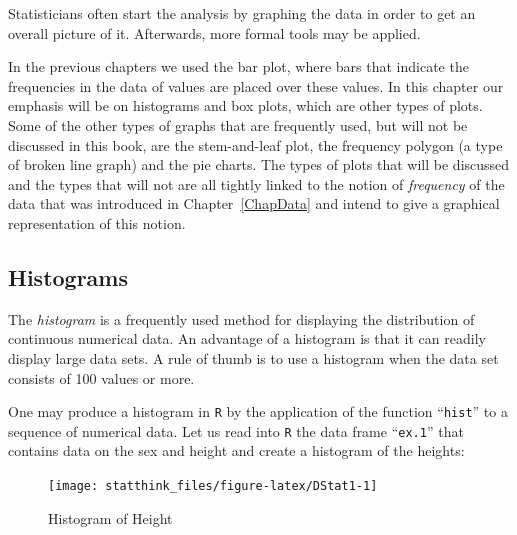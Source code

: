 \documentclass[]{krantz}
\makeatletter
\newenvironment{Shaded}{\begin{snugshade}}{\end{snugshade}}
\newcommand{\FloatTok}[1]{\textcolor[rgb]{0.00,0.00,0.81}{#1}}
\newcommand{\KeywordTok}[1]{\textcolor[rgb]{0.13,0.29,0.53}{\textbf{#1}}}
\newcommand{\NormalTok}[1]{#1}
\newcommand{\OperatorTok}[1]{\textcolor[rgb]{0.81,0.36,0.00}{\textbf{#1}}}
\newcommand{\StringTok}[1]{\textcolor[rgb]{0.31,0.60,0.02}{#1}}
\newenvironment{kframe}{%
\medskip{}
\setlength{\fboxsep}{.8em}
 \def\at@end@of@kframe{}%
 \ifinner\ifhmode%
  \def\at@end@of@kframe{\end{minipage}}%
  \begin{minipage}{\columnwidth}%
 \fi\fi%
 \def\FrameCommand##1{\hskip\@totalleftmargin \hskip-\fboxsep
 \colorbox{shadecolor}{##1}\hskip-\fboxsep
     \hskip-\linewidth \hskip-\@totalleftmargin \hskip\columnwidth}%
 \MakeFramed {\advance\hsize-\width
   \@totalleftmargin\z@ \linewidth\hsize
   \@setminipage}}%
 {\par\unskip\endMakeFramed%
 \at@end@of@kframe}
\renewenvironment{Shaded}{\begin{kframe}}{\end{kframe}}
\theoremstyle{definition}
\theoremstyle{definition}
\theoremstyle{definition}
\theoremstyle{remark}
\makeatother
\begin{document}
Statisticians often start the analysis by graphing the data in order to
get an overall picture of it. Afterwards, more formal tools may be
applied.

In the previous chapters we used the bar plot, where bars that indicate
the frequencies in the data of values are placed over these values. In
this chapter our emphasis will be on histograms and box plots, which are
other types of plots. Some of the other types of graphs that are
frequently used, but will not be discussed in this book, are the
stem-and-leaf plot, the frequency polygon (a type of broken line graph)
and the pie charts. The types of plots that will be discussed and the
types that will not are all tightly linked to the notion of \emph{frequency}
of the data that was introduced in Chapter~\ref{ChapData} and intend to
give a graphical representation of this notion.

\hypertarget{histograms}{%
\subsection{Histograms}\label{histograms}}

The \emph{histogram} is a frequently used method for displaying the
distribution of continuous numerical data. An advantage of a histogram
is that it can readily display large data sets. A rule of thumb is to
use a histogram when the data set consists of 100 values or more.

One may produce a histogram in \texttt{R} by the application of the function
``\texttt{hist}'' to a sequence of numerical data. Let us read into \texttt{R} the data
frame ``\texttt{ex.1}'' that contains data on the sex and height and create a
histogram of the heights:

\begin{Shaded}
\end{Shaded}

\begin{figure}

{\centering \texttt{[image: statthink\_files/figure-latex/DStat1-1]} 

}

\caption{Histogram of Height}\label{fig:DStat1}
\end{figure}
\end{document}
